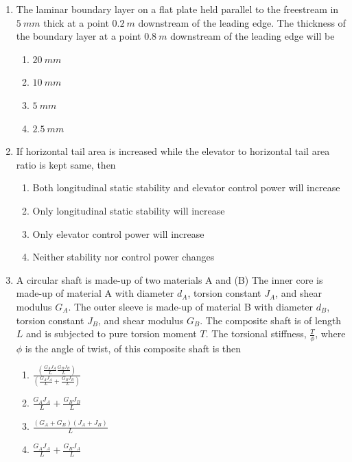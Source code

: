 \documentclass{article}
\begin{document}
\begin{enumerate}
    \item The laminar boundary layer on a flat plate held parallel to the freestream in $5\ mm$ thick at a point $0.2\ m$ downstream of the leading edge. The thickness of the boundary layer at a point $0.8\ m$ downstream of the leading edge will be
    \begin{multicols}{4}
    \begin{enumerate}
        \item $20\ mm$
        \item $10\ mm$
        \item $5\ mm$
        \item $2.5\ mm$
    \end{enumerate}
    \end{multicols}
        

    \item If horizontal tail area is increased while the elevator to horizontal tail area ratio is kept same, then
    \begin{enumerate}
        \item Both longitudinal static stability and elevator control power will increase
        \item Only longitudinal static stability will increase
        \item Only elevator control power will increase
        \item Neither stability nor control power changes
    \end{enumerate}
        

    \item A circular shaft is made-up of two materials A and (B) The inner core is made-up of material A with diameter $d_A$, torsion constant $J_A$, and shear modulus $G_A$. The outer sleeve is made-up of material B with diameter $d_B$, torsion constant $J_B$, and shear modulus $G_B$. The composite shaft is of length $L$ and is subjected to pure torsion moment $T$. The torsional stiffness, $\frac{T}{\phi}$, where $\phi$ is the angle of twist, of this composite shaft is then
        \begin{figure}[H]
            \centering
            
            \caption{}
            \label{fig:q44}
        \end{figure}

    \begin{enumerate}
        \item $\frac{\left( \frac{G_A J_A}{L} \frac{G_B J_B}{L} \right)}{\left( \frac{G_A J_A}{L} + \frac{G_B J_B}{L} \right)}$
        \item $\frac{G_A J_A}{L} + \frac{G_B J_B}{L}$
        \item $\frac{(G_A + G_B)(J_A + J_B)}{L}$
        \item $\frac{G_A J_A}{L} + \frac{G_B J_A}{L}$
    \end{enumerate}
        


\end{enumerate}
\end{document}
